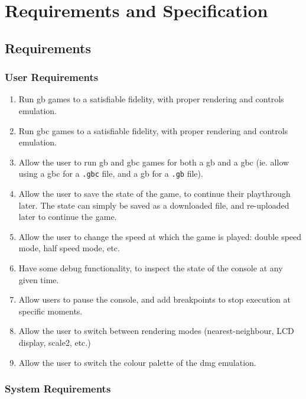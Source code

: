 \documentclass[11pt]{report}
\begin{document}
\chapter{Requirements and Specification}

\section{Requirements}

\subsection{User Requirements}

\begin{enumerate}[start=1,label=U\arabic*.]
    \item Run \glsdesc{gb} games to a satisfiable fidelity, with proper rendering and controls emulation.
    \item Run \glsdesc{gbc} games to a satisfiable fidelity, with proper rendering and controls emulation.
    \item Allow the user to run \gls{gb} and \gls{gbc} games for both a \glsdesc{gb} and a \glsdesc{gbc} (ie. allow using a \gls{gbc} for a \texttt{.gbc} file, and a \gls{gb} for a \texttt{.gb} file).
    \item Allow the user to save the state of the game, to continue their playthrough later. The state can simply be saved as a downloaded file, and re-uploaded later to continue the game.
    \item Allow the user to change the speed at which the game is played: double speed mode, half speed mode, etc.
    \item Have some debug functionality, to inspect the state of the console at any given time.
    \item Allow users to pause the console, and add breakpoints to stop execution at specific moments.
    \item Allow the user to switch between rendering modes (nearest-neighbour, LCD display, scale2, etc.)
    \item Allow the user to switch the colour palette of the \gls{dmg} emulation.
\end{enumerate}

\subsection{System Requirements}
\end{document}
